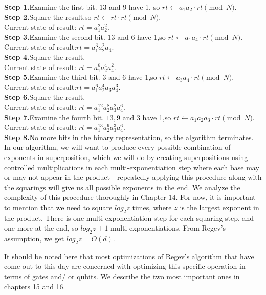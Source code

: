 \textbf{Step 1.}Examine the first bit. $13$ and $9$ have 1, so $rt \gets a_1a_2 \cdot rt \pmod N$.\\
\textbf{Step 2.}Square the result,so $rt \gets rt \cdot rt \pmod N$.\\
Current state of result: $rt = a_1^2a_2^2$.\\
\textbf{Step 3.}Examine the second bit. $13$ and $6$ have 1,so $rt \gets a_1a_4 \cdot rt \pmod N$.\\
Current state of result:$rt = a_1^3a_2^2a_4$.\\
\textbf{Step 4.}Square the result.\\
Current state of result: $rt = a_1^6a_2^4a_4^2$.\\
\textbf{Step 5.}Examine the third bit. $3$ and $6$ have 1,so $rt \gets a_3a_4 \cdot rt \pmod N$.\\
Current state of result:$rt = a_1^6a_2^4a_3a_4^3$.\\
\textbf{Step 6.}Square the result.\\
Current state of result: $rt = a_1^{12}a_2^8a_3^2a_4^6$.\\
\textbf{Step 7.}Examine the fourth bit. $13,9$ and $3$ have 1,so $rt \gets a_1a_2a_3 \cdot rt \pmod N$.\\
Current state of result: $rt = a_1^{13}a_2^9a_3^3a_4^6$.\\
\textbf{Step 8.}No more bits in the binary representation, so the algorithm terminates.\\

In our algorithm, we will want to produce every possible combination of exponents in superposition, which we will do by creating superpositions using controlled multiplications in each multi-exponentiation step where each base may or may not appear in the product - repeatedly applying this procedure along with the squarings will give us all possible exponents in the end. We analyze the complexity of this procedure thoroughly in Chapter 14. For now, it is important to mention that we need to square $log_2z$ times, where $z$ is the largest exponent in the product. There is one multi-exponentiation step for each squaring step, and one more at the end, so $log_2z + 1$ multi-exponentiations. From Regev's assumption, we get $log_2z = O(d)$.

It should be noted here that most optimizations of Regev's algorithm that have come out to this day are concerned with optimizing this specific operation in terms of gates and/ or qubits. We describe the two most important ones in chapters 15 and 16. 

